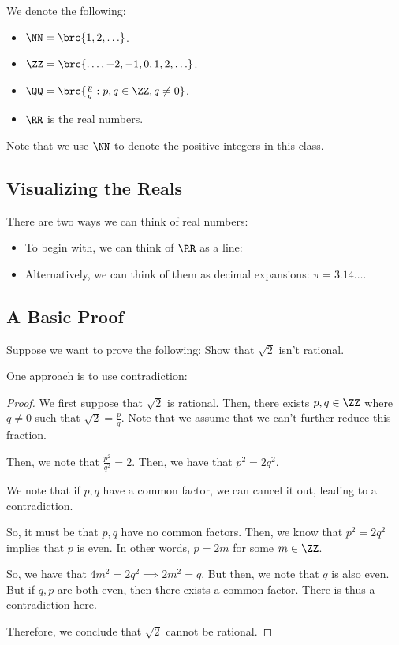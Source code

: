\documentclass[openany]{book}
\begin{document}
\begin{example}
	We denote the following:
	\begin{itemize}
		\item $\NN = \brc{1, 2, \ldots}$.
		\item $\ZZ = \brc{\ldots, -2, -1, 0, 1, 2, \ldots}$.
		\item $\QQ = \brc{\frac{p}{q} : p, q \in \ZZ, q \neq 0}$.
		\item $\RR$ is the real numbers.
	\end{itemize}
	
	Note that we use $\NN$ to denote the positive integers in this class.
\end{example}

\subsection{Visualizing the Reals}
There are two ways we can think of real numbers:
\begin{itemize}
	\item To begin with, we can think of $\RR$ as a line:
	\item Alternatively, we can think of them as decimal expansions: $\pi = 3.14\ldots$.
\end{itemize}

\subsection{A Basic Proof}
\begin{example}
	Suppose we want to prove the following: Show that $\sqrt{2}$ isn't rational.
	
	One approach is to use contradiction:
	
	\begin{proof}
		We first suppose that $\sqrt{2}$ is rational. Then, there exists $p, q \in \ZZ$ where $q \neq 0$ such that $\sqrt{2} = \frac{p}{q}$. Note that we assume that we can't further reduce this fraction.
		
		Then, we note that $\frac{p^{2}}{q^{2}} = 2$. Then, we have that $p^{2} = 2q^{2}$.
		
		We note that if $p, q$ have a common factor, we can cancel it out, leading to a contradiction.
		
		So, it must be that $p, q$ have no common factors. Then, we know that $p^{2} = 2q^{2}$ implies that $p$ is even. In other words, $p = 2m$ for some $m \in \ZZ$.
		
		So, we have that $4m^{2} = 2q^{2} \implies 2m^{2} = q$. But then, we note that $q$ is also even. But if $q, p$ are both even, then there exists a common factor. There is thus a contradiction here.
		
		Therefore, we conclude that $\sqrt{2}$ cannot be rational.
	\end{proof}
\end{example}
\end{document}
